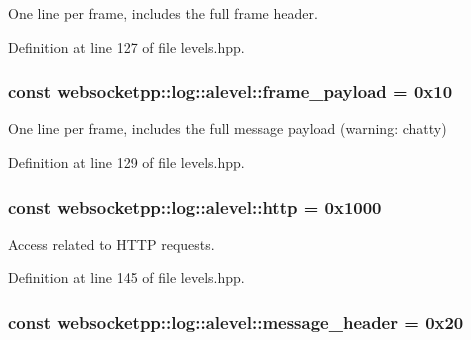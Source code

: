 One line per frame, includes the full frame header. 



Definition at line 127 of file levels.\+hpp.

\hypertarget{structwebsocketpp_1_1log_1_1alevel_aa38cfdf7a82f33cac319438462707e90}{}
\subsubsection[{frame\+\_\+payload}]{ const websocketpp\+::log\+::alevel\+::frame\+\_\+payload = 0x10\hspace{0.3cm}{\ttfamily [static]}}\label{structwebsocketpp_1_1log_1_1alevel_aa38cfdf7a82f33cac319438462707e90}


One line per frame, includes the full message payload (warning\+: chatty) 



Definition at line 129 of file levels.\+hpp.

\hypertarget{structwebsocketpp_1_1log_1_1alevel_af6e731e5771ab1a2267f79e5b9b8183a}{}
\subsubsection[{http}]{ const websocketpp\+::log\+::alevel\+::http = 0x1000\hspace{0.3cm}{\ttfamily [static]}}\label{structwebsocketpp_1_1log_1_1alevel_af6e731e5771ab1a2267f79e5b9b8183a}


Access related to H\+T\+T\+P requests. 



Definition at line 145 of file levels.\+hpp.

\hypertarget{structwebsocketpp_1_1log_1_1alevel_ae05d0972bc4d68cca49faf8c82d40304}{}
\subsubsection[{message\+\_\+header}]{ const websocketpp\+::log\+::alevel\+::message\+\_\+header = 0x20\hspace{0.3cm}{\ttfamily [static]}}\label{structwebsocketpp_1_1log_1_1alevel_ae05d0972bc4d68cca49faf8c82d40304}



